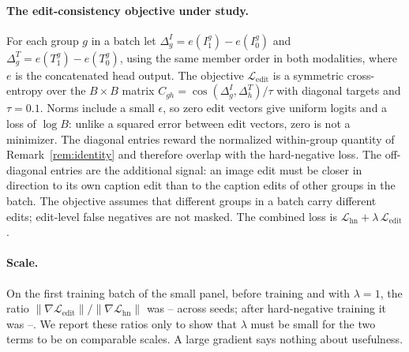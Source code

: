 \paragraph{The edit-consistency objective under study.}
For each group $g$ in a batch let $\Delta^I_g=e(I^g_1)-e(I^g_0)$ and $\Delta^T_g=e(T^g_1)-e(T^g_0)$,
using the same member order in both modalities, where $e$ is the concatenated head output. The
objective $\mathcal{L}_{\mathrm{edit}}$ is a symmetric cross-entropy over the $B{\times}B$ matrix
$C_{gh}=\cos(\Delta^I_g,\Delta^T_h)/\tau$ with diagonal targets and $\tau=0.1$. Norms include a
small $\epsilon$, so zero edit vectors give uniform logits and a loss of $\log B$: unlike a squared
error between edit vectors, zero is not a minimizer. The diagonal entries reward the normalized
within-group quantity of Remark~\ref{rem:identity} and therefore overlap with the hard-negative
loss. The off-diagonal entries are the additional signal: an image edit must be closer in direction
to its own caption edit than to the caption edits of other groups in the batch. The objective
assumes that different groups in a batch carry different edits; edit-level false negatives are not
masked. The combined loss is $\mathcal{L}_{\mathrm{hn}}+\lambda\,\mathcal{L}_{\mathrm{edit}}$.

\paragraph{Scale.}
On the first training batch of the small panel, before training and with $\lambda=1$, the ratio
$\|\nabla\mathcal{L}_{\mathrm{edit}}\|/\|\nabla\mathcal{L}_{\mathrm{hn}}\|$ was \SPgradInitMin--\SPgradInitMax{}
across seeds; after hard-negative training it was \SPgradEndMin--\SPgradEndMax. We report these
ratios only to show that $\lambda$ must be small for the two terms to be on comparable scales. A
large gradient says nothing about usefulness.
